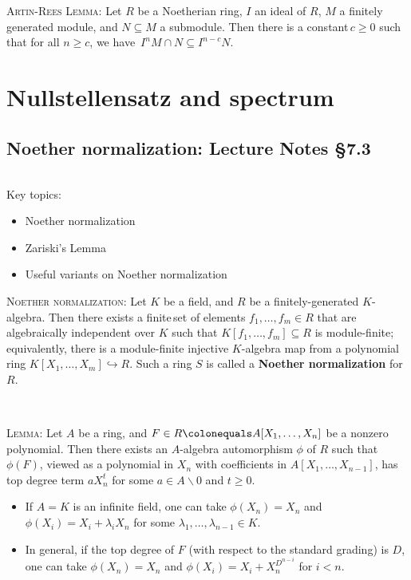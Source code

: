 \documentclass[12pt]{amsart}
\newcommand{\0}{$\phantom{.}$}
\newcommand{\1}{\mathbbm{1}}
\newcommand\ceq{\colonequals}
\begin{document}
\

\

\noindent \textsc{Artin-Rees Lemma:} Let $R$ be a Noetherian ring, $I$ an ideal of $R$, $M$ a finitely generated module, and $N\subseteq M$ a submodule. Then there is a constant\footnotemark\,$c\geq 0$ such that for all $n\geq c$, we have~${I^{n} M \cap N \subseteq I^{n-c} N}$.



\newpage

\section{Nullstellensatz and spectrum} 
\setcounter{subsection}{14}
\subsection{Noether normalization: Lecture Notes \S7.3} \0

\begin{framed} Key topics:
\begin{itemize}
\item Noether normalization
\item Zariski's Lemma
\item Useful variants on Noether normalization
\end{itemize}
\end{framed}


\noindent \textsc{Noether normalization:} Let $K$ be a field, and $R$ be a finitely-generated $K$-algebra. Then there exists a finite\footnotemark\,set of elements $f_1,\dots,f_m\in R$ that are algebraically independent over $K$ such that ${K[f_1,\dots,f_m] \subseteq R}$ is module-finite; equivalently, there is a module-finite injective $K$-algebra map from a polynomial ring ${K[X_1,\dots,X_m] \hookrightarrow R}$. Such a ring $S$ is called a \textbf{Noether normalization} for~$R$.

\

\noindent \textsc{Lemma:} Let $A$ be a ring, and $F \in R \ceq A[X_1,\dots,X_n]$ be a nonzero polynomial. Then there exists an $A$-algebra automorphism $\phi$ of $R$ such that $\phi(F)$, viewed as a polynomial in $X_n$ with coefficients in $A[X_1,\dots, X_{n-1}]$, has top degree term $a X_n^t$ for some $a\in A\smallsetminus 0$ and $t\geq 0$.
\begin{itemize}
\item If $A=K$ is an infinite field, one can take $\phi(X_n)=X_n$ and $\phi(X_i) = X_i +\lambda_i X_n$ for some $\lambda_1,\dots,\lambda_{n-1} \in K$.
\item In general, if the top degree of $F$ (with respect to the standard grading) is $D$, one can take ${\phi(X_n) = X_n}$ and $\phi(X_i) = X_i + X_n^{D^{n-i}}$ for $i<n$.
\end{itemize}
\end{document}
